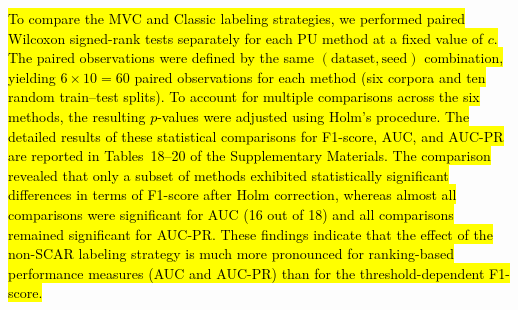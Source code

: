 \documentclass[applsci,article,submit,pdftex,moreauthors]{Definitions/mdpi}
\newcommand{\rev}[1]{\hl{#1}}
\begin{document}
\rev{To compare the MVC and Classic labeling strategies, we performed paired Wilcoxon signed-rank tests separately for each PU method at a fixed value of $c$. The paired observations were defined by the same $(\text{dataset}, \text{seed})$ combination, yielding $6 \times 10 = 60$ paired observations for each method (six corpora and ten random train--test splits). To account for multiple comparisons across the six methods, the resulting $p$-values were adjusted using Holm's procedure. The detailed results of these statistical comparisons for F1-score, AUC, and AUC-PR are reported in Tables~18--20 of the Supplementary Materials. The comparison revealed that only a subset of methods exhibited statistically significant differences in terms of F1-score after Holm correction, whereas almost all comparisons were significant for AUC (16 out of 18) and all comparisons remained significant for AUC-PR. These findings indicate that the effect of the non-SCAR labeling strategy is much more pronounced for ranking-based performance measures (AUC and AUC-PR) than for the threshold-dependent F1-score.}

\begin{table}[htbp]
\caption{Benchmark Results Summary (\texttt{mvc}): average F1 over $c_{calc} \in \{0.2, 0.5, 0.8\}$.}
\label{tab:benchmark_summary_mvc}
\centering
\small
{}
\end{table}
\end{document}
